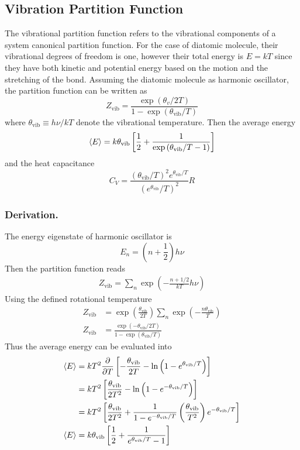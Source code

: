 \documentclass[../../../Main.tex]{subfiles}
\begin{document}
\subsection*{Vibration Partition Function}
The vibrational partition function refers to the vibrational components of a system canonical partition function.
For the case of diatomic molecule, their vibrational degrees of freedom is one, however their total energy is $E=kT$ since they have both kinetic and potential energy based on the motion and the stretching of the bond.
Assuming the diatomic molecule as harmonic oscillator, the partition function can be written as
\begin{equation*}
	Z_\text{vib}=\frac{\exp\left({\theta_v}/{2T}\right)}{1-\exp\left({\theta_\text{vib}}/{T}\right)}
\end{equation*}
where $\theta_\text{vib}\equiv h\nu/kT$ denote the vibrational temperature. Then the average energy
\begin{equation*}
	\braket{E}=k\theta_\text{vib}\left[\frac{1}{2}+\frac{1}{\exp\left(\theta_\text{vib}/T-1\right)}\right]
\end{equation*}
and the heat capacitance
\begin{equation*}
	C_V=\frac{(\theta_\text{vib}/T)^2e^{\theta_\text{vib}/T}}{(e^{\theta_\text{vib}}/T)^2}R
\end{equation*}

\subsubsection{Derivation.} The energy eigenstate of harmonic oscillator is
\begin{equation*}
	E_n=\left(n+\frac{1}{2}\right)h\nu
\end{equation*}
Then the partition function reads
\begin{align*}
	Z_\text{vib}=\sum_n \exp\left(-\frac{n+1/2}{kT}h\nu\right)
\end{align*}
Using the defined rotational temperature
\begin{align*}
	Z_\text{vib} & = \exp\left(\frac{\theta_\text{vib}}{2T}\right)\sum_n \exp\left(-\frac{n\theta_\text{vib}}{T}\right) \\
	Z_\text{vib} & =\frac{\exp(-\theta_\text{vib}/2T)}{1-\exp(\theta_\text{vib}/T)}
\end{align*}
Thus the average energy can be evaluated into
\begin{align*}
	\braket{E} & =kT^2\frac{\partial}{\partial T}\left[-\frac{\theta_\text{vib}}{2T}-\ln\left(1-e^{\theta_\text{vib}/T}\right)\right]                                     \\
	           & =kT^2\left[\frac{\theta_\text{vib}}{2T^2} -\ln\left(1-e^{-\theta_\text{vib}/T}\right)\right]                                                             \\
	           & =kT^2\left[\frac{\theta_\text{vib}}{2T^2} +\frac{1}{1-e^{-\theta_\text{vib}/T}}\left(\frac{\theta_\text{vib}}{T^2}\right)e^{-\theta_\text{vib}/T}\right] \\
	\braket{E} & =k\theta_\text{vib}\left[\frac{1}{2}+\frac{1}{e^{\theta_\text{vib}/T}-1}\right]
\end{align*}
\end{document}
